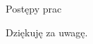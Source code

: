 \documentclass[11pt,pdftex,mathserif]{beamer}\usepackage[]{graphicx}\usepackage[]{color}
\theoremstyle{definition}
\begin{document}
\begin{frame}{Postępy prac}

\end{frame}



% 
% 
% 
% 

\begin{frame}{}
   \begin{center}
      \Huge{Dziękuję za uwagę.}
   \end{center}
\end{frame}
\end{document}
